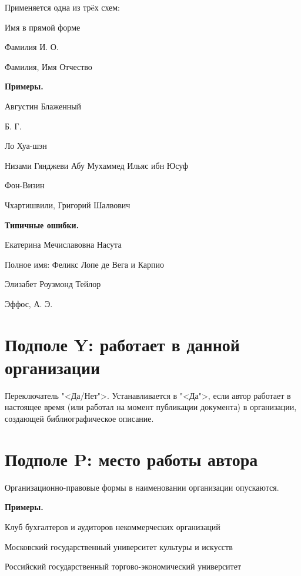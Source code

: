 Применяется одна из тр\"eх схем:

\begin{cutelist}
    \item Имя в прямой форме
    \item Фамилия И. О.
    \item Фамилия, Имя Отчество
\end{cutelist}

\textbf{Примеры.}

\begin{cutelist}
    \item Августин Блаженный
    \item Б. Г.
    \item Ло Хуа-шэн
    \item Низами Гянджеви Абу Мухаммед Ильяс ибн Юсуф
    \item Фон-Визин
    \item Чхартишвили, Григорий Шалвович
\end{cutelist}

\textbf{Типичные ошибки.}

\begin{cutelist}
    \item Екатерина Мечиславовна Насута
    \item Полное имя: Феликс Лопе де Вега и Карпио
    \item Элизабет Роузмонд Тейлор
    \item Эффос, А. Э.
\end{cutelist}

\section{Подполе Y: работает в данной организации}

Переключатель "<Да/Нет">.
Устанавливается в "<Да">, если автор работает в настоящее время (или работал на момент публикации документа) в организации, создающей библиографическое описание.

\section{Подполе P: место работы автора}

Организационно-правовые формы в наименовании организации опускаются.

\textbf{Примеры.}

\begin{cutelist}
    \item Клуб бухгалтеров и аудиторов некоммерческих организаций
    \item Московский государственный университет культуры и искусств
    \item Российский государственный торгово-экономический университет
\end{cutelist}

